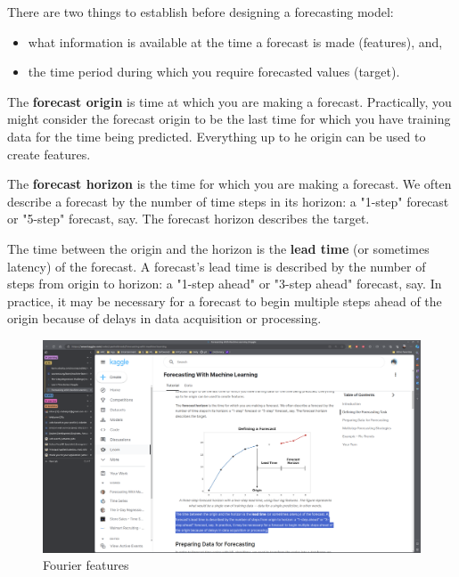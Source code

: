 \documentclass[12pt]{report}
\begin{document}
There are two things to establish before designing a forecasting model:
\begin{itemize}
  \item what information is available at the time a forecast is made (features), and,
  \item the time period during which you require forecasted values (target).
\end{itemize}

The \textbf{forecast origin} is time at which you are making a forecast. Practically, you might consider the forecast origin to be the last time for which you have training data for the time being predicted. Everything up to he origin can be used to create features.

The \textbf{forecast horizon} is the time for which you are making a forecast. We often describe a forecast by the number of time steps in its horizon: a "1-step" forecast or "5-step" forecast, say. The forecast horizon describes the target.

The time between the origin and the horizon is the \textbf{lead time} (or sometimes latency) of the forecast. A forecast's lead time is described by the number of steps from origin to horizon: a "1-step ahead" or "3-step ahead" forecast, say. In practice, it may be necessary for a forecast to begin multiple steps ahead of the origin because of delays in data acquisition or processing.

\begin{figure}[htbp]
  \begin{center}
    \includegraphics[trim =30cm 10.0cm 20cm 19cm, clip, scale=0.3]{pics/forecasting.png}
    \caption{Fourier features}
    \label{default}
  \end{center}
\end{figure}
\end{document}
